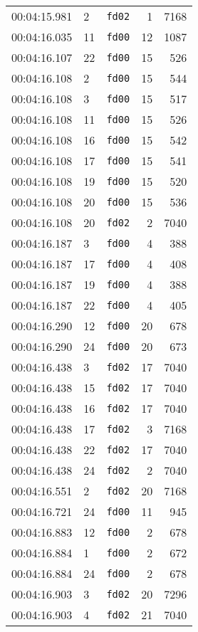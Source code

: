 \documentclass{article}
\begin{document}
\begin{longtable}{lllrr}
00:04:15.981 & 2 & \texttt{fd02} & 1 & 7168 \\
00:04:16.035 & 11 & \texttt{fd00} & 12 & 1087 \\
00:04:16.107 & 22 & \texttt{fd00} & 15 & 526 \\
00:04:16.108 & 2 & \texttt{fd00} & 15 & 544 \\
00:04:16.108 & 3 & \texttt{fd00} & 15 & 517 \\
00:04:16.108 & 11 & \texttt{fd00} & 15 & 526 \\
00:04:16.108 & 16 & \texttt{fd00} & 15 & 542 \\
00:04:16.108 & 17 & \texttt{fd00} & 15 & 541 \\
00:04:16.108 & 19 & \texttt{fd00} & 15 & 520 \\
00:04:16.108 & 20 & \texttt{fd00} & 15 & 536 \\
00:04:16.108 & 20 & \texttt{fd02} & 2 & 7040 \\
00:04:16.187 & 3 & \texttt{fd00} & 4 & 388 \\
00:04:16.187 & 17 & \texttt{fd00} & 4 & 408 \\
00:04:16.187 & 19 & \texttt{fd00} & 4 & 388 \\
00:04:16.187 & 22 & \texttt{fd00} & 4 & 405 \\
00:04:16.290 & 12 & \texttt{fd00} & 20 & 678 \\
00:04:16.290 & 24 & \texttt{fd00} & 20 & 673 \\
00:04:16.438 & 3 & \texttt{fd02} & 17 & 7040 \\
00:04:16.438 & 15 & \texttt{fd02} & 17 & 7040 \\
00:04:16.438 & 16 & \texttt{fd02} & 17 & 7040 \\
00:04:16.438 & 17 & \texttt{fd02} & 3 & 7168 \\
00:04:16.438 & 22 & \texttt{fd02} & 17 & 7040 \\
00:04:16.438 & 24 & \texttt{fd02} & 2 & 7040 \\
00:04:16.551 & 2 & \texttt{fd02} & 20 & 7168 \\
00:04:16.721 & 24 & \texttt{fd00} & 11 & 945 \\
00:04:16.883 & 12 & \texttt{fd00} & 2 & 678 \\
00:04:16.884 & 1 & \texttt{fd00} & 2 & 672 \\
00:04:16.884 & 24 & \texttt{fd00} & 2 & 678 \\
00:04:16.903 & 3 & \texttt{fd02} & 20 & 7296 \\
00:04:16.903 & 4 & \texttt{fd02} & 21 & 7040 \\

\end{longtable}
\end{document}
